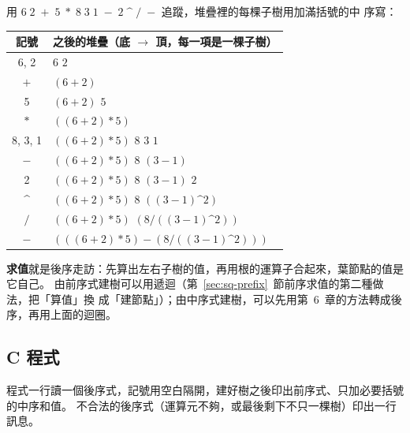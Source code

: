 用 $6\;2\;+\;5\;*\;8\;3\;1\;-\;2\;\text{\textasciicircum}\;/\;-$ 追蹤，堆疊裡的每棵子樹用加滿括號的中
序寫：

\begin{center}
\begin{tabular}{cl}
\toprule
記號 & 之後的堆疊（底 $\to$ 頂，每一項是一棵子樹）\\
\midrule
6, 2 & $6$ \quad $2$ \\
$+$ & $(6 + 2)$ \\
5 & $(6 + 2)$ \quad $5$ \\
$*$ & $((6 + 2) * 5)$ \\
8, 3, 1 & $((6 + 2) * 5)$ \quad $8$ \quad $3$ \quad $1$ \\
$-$ & $((6 + 2) * 5)$ \quad $8$ \quad $(3 - 1)$ \\
2 & $((6 + 2) * 5)$ \quad $8$ \quad $(3 - 1)$ \quad $2$ \\
\textasciicircum & $((6 + 2) * 5)$ \quad $8$ \quad $((3 - 1) \text{\textasciicircum} 2)$ \\
$/$ & $((6 + 2) * 5)$ \quad $(8 / ((3 - 1) \text{\textasciicircum} 2))$ \\
$-$ & $(((6 + 2) * 5) - (8 / ((3 - 1) \text{\textasciicircum} 2)))$ \\
\bottomrule
\end{tabular}
\end{center}

\textbf{求值}就是後序走訪：先算出左右子樹的值，再用根的運算子合起來，葉節點的值是
它自己。 由前序式建樹可以用遞迴（第~\ref{sec:sq-prefix}~節前序求值的第二種做法，把「算值」換
成「建節點」）；由中序式建樹，可以先用第~6~章的方法轉成後序，再用上面的迴圈。

\subsection{C 程式}

程式一行讀一個後序式，記號用空白隔開，建好樹之後印出前序式、只加必要括號的中序和值。 不合法的後序式（運算元不夠，或最後剩下不只一棵樹）印出一行訊息。

